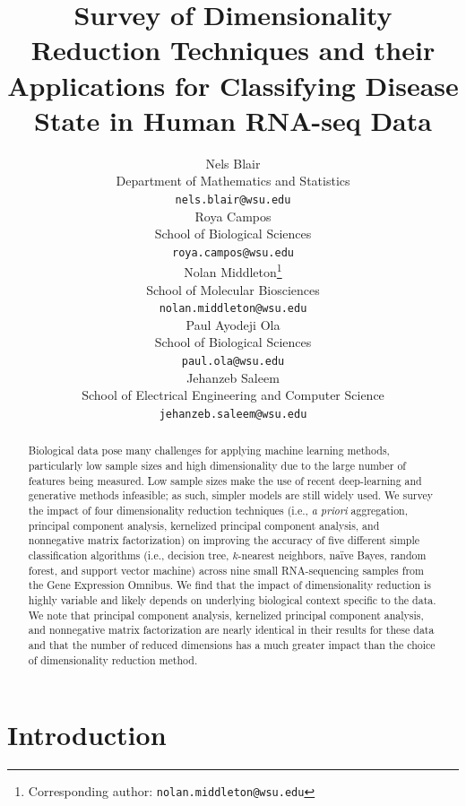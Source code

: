 \documentclass{article}
\title{Survey of Dimensionality Reduction Techniques and their Applications for Classifying Disease State in Human RNA-seq Data}
\author{%
	Nels Blair \\
	Department of Mathematics and Statistics \\
	\texttt{nels.blair@wsu.edu} \\
	\And
	Roya Campos \\
	School of Biological Sciences \\
	\texttt{roya.campos@wsu.edu} \\
	\And
	Nolan Middleton\thanks{Corresponding author: \texttt{nolan.middleton@wsu.edu}} \\
	School of Molecular Biosciences \\
	\texttt{nolan.middleton@wsu.edu} \\
	\And
	Paul Ayodeji Ola \\
	School of Biological Sciences \\
	\texttt{paul.ola@wsu.edu} \\
	\And
	Jehanzeb Saleem \\
	School of Electrical Engineering and Computer Science \\
	\texttt{jehanzeb.saleem@wsu.edu} \\
}
\begin{document}
\maketitle

\begin{abstract}
	Biological data pose many challenges for applying machine learning methods, particularly low sample sizes and high dimensionality due to the large number of features being measured. Low sample sizes make the use of recent deep-learning and generative methods infeasible; as such, simpler models are still widely used. We survey the impact of four dimensionality reduction techniques (i.e., {\itshape a priori} aggregation, principal component analysis, kernelized principal component analysis, and nonnegative matrix factorization) on improving the accuracy of five different simple classification algorithms (i.e., decision tree, $k$-nearest neighbors, na\"ive Bayes, random forest, and support vector machine) across nine small RNA-sequencing samples from the Gene Expression Omnibus. We find that the impact of dimensionality reduction is highly variable and likely depends on underlying biological context specific to the data. We note that principal component analysis, kernelized principal component analysis, and nonnegative matrix factorization are nearly identical in their results for these data and that the number of reduced dimensions has a much greater impact than the choice of dimensionality reduction method.
\end{abstract}

\section{Introduction}
\end{document}
